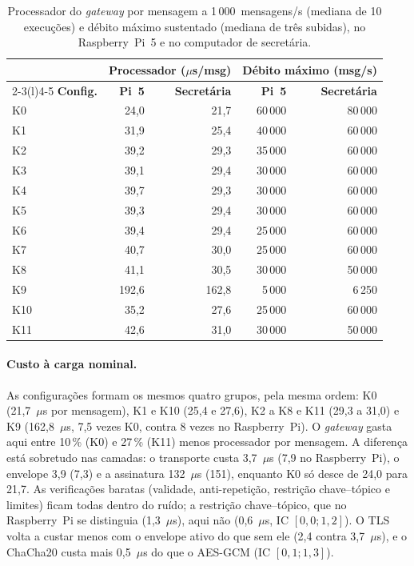 \begin{table}[ht]
  \centering
  \caption{Processador do \emph{gateway} por mensagem a 1\,000~mensagens/s
    (mediana de 10 execuções) e débito máximo sustentado (mediana de três subidas),
    no Raspberry~Pi~5 e no computador de secretária.}
  \label{tab:referencia}
  \footnotesize
  \begin{tabular}{@{}lrrrr@{}}
    \toprule
    & \multicolumn{2}{c}{\textbf{Processador ($\mu$s/msg)}} &
      \multicolumn{2}{c}{\textbf{Débito máximo (msg/s)}} \\
    \cmidrule(lr){2-3}\cmidrule(l){4-5}
    \textbf{Config.} & \textbf{Pi~5} & \textbf{Secretária} & \textbf{Pi~5} &
      \textbf{Secretária} \\
    \midrule
    K0  & 24,0  & 21,7  & 60\,000 & 80\,000 \\
    K1  & 31,9  & 25,4  & 40\,000 & 60\,000 \\
    K2  & 39,2  & 29,3  & 35\,000 & 60\,000 \\
    K3  & 39,1  & 29,4  & 30\,000 & 60\,000 \\
    K4  & 39,7  & 29,3  & 30\,000 & 60\,000 \\
    K5  & 39,3  & 29,4  & 30\,000 & 60\,000 \\
    K6  & 39,4  & 29,4  & 25\,000 & 60\,000 \\
    K7  & 40,7  & 30,0  & 25\,000 & 60\,000 \\
    K8  & 41,1  & 30,5  & 30\,000 & 50\,000 \\
    K9  & 192,6 & 162,8 & 5\,000  & 6\,250 \\
    K10 & 35,2  & 27,6  & 25\,000 & 60\,000 \\
    K11 & 42,6  & 31,0  & 30\,000 & 50\,000 \\
    \bottomrule
  \end{tabular}
\end{table}

\paragraph{Custo à carga nominal.} As configurações formam os mesmos quatro
grupos, pela mesma ordem: K0 (21,7~$\mu$s por mensagem), K1 e K10 (25,4 e 27,6),
K2 a K8 e K11 (29,3 a 31,0) e K9 (162,8~$\mu$s, 7,5 vezes K0, contra 8 vezes no
Raspberry~Pi). O \emph{gateway} gasta aqui entre 10\,\% (K0) e 27\,\% (K11) menos
processador por mensagem. A diferença está sobretudo nas camadas: o transporte
custa 3,7~$\mu$s (7,9 no Raspberry~Pi), o envelope 3,9 (7,3) e a assinatura
132~$\mu$s (151), enquanto K0 só desce de 24,0 para 21,7. As verificações baratas
(validade, anti-repetição, restrição chave--tópico e limites) ficam todas dentro
do ruído; a restrição chave--tópico, que no Raspberry~Pi se distinguia
(1,3~$\mu$s), aqui não (0,6~$\mu$s, IC $[0{,}0; 1{,}2]$). O TLS volta a custar
menos com o envelope ativo do que sem ele (2,4 contra 3,7~$\mu$s), e o ChaCha20
custa mais 0,5~$\mu$s do que o AES-GCM (IC $[0{,}1; 1{,}3]$).

